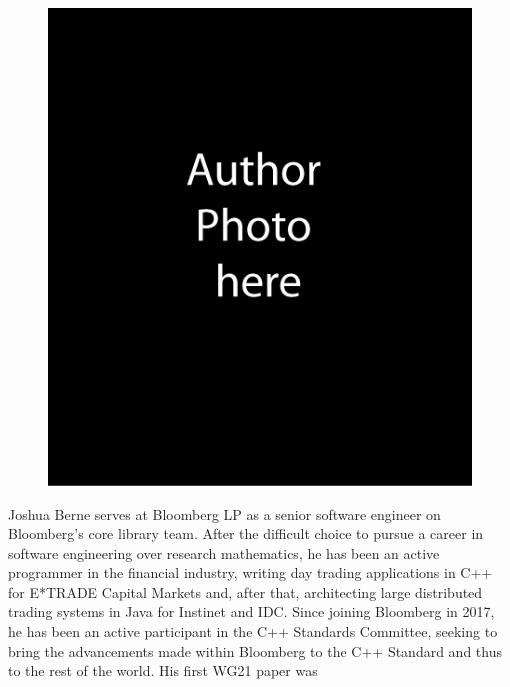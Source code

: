 \vspace*{18pt} %
\begin{figure}\includegraphics{emcpps-authorphoto-JMB}%
\end{figure} \noindent Joshua Berne serves at Bloomberg LP as a senior
software engineer on Bloomberg’s core library team. After the difficult choice
to pursue a career in software engineering over research mathematics, he has
been an active programmer in the financial industry, writing day trading
applications in C++ for E*TRADE Capital Markets and, after that, architecting
large distributed trading systems in Java for Instinet and IDC. Since joining
Bloomberg in 2017, he has been an active participant in the C++ Standards
Committee, seeking to bring the advancements made within Bloomberg to the
C++ Standard and thus to the rest of the world.  His first WG21 paper was
\cite{wg21P1332R0}

